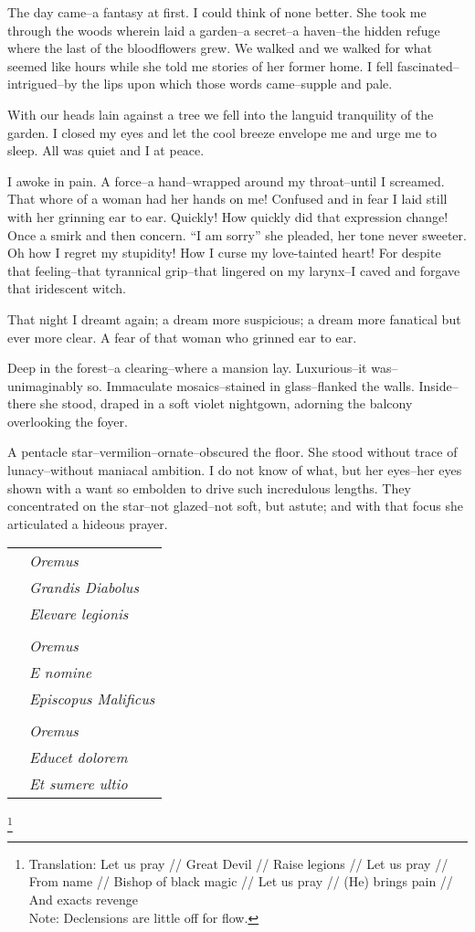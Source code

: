 \documentclass{article}
\begin{document}
\noindent %
The day came--a fantasy at first.
I could think of none better. %
She took me through the woods wherein laid a garden--a
secret--a haven--the hidden refuge where
the last of the bloodflowers grew.
We walked and we walked for what seemed like hours
while she told me stories of her former home.
I fell fascinated--intrigued--by the lips
upon which those words came--supple and pale.


With our heads lain against a tree we
fell into the languid tranquility of the garden.
I closed my eyes and let the cool breeze envelope me
and urge me to sleep. All was quiet and I at peace.


I awoke in pain.
A force--a hand--wrapped around my throat--until I screamed.
That whore of a woman had her hands on me!
Confused and in fear I laid still
with her grinning ear to ear.
Quickly! How quickly did that expression change!
Once a smirk and then concern.
``I am sorry'' she pleaded, her tone never sweeter.
Oh how I regret my stupidity!
How I curse my love-tainted heart!
For despite that feeling--that
tyrannical grip--that lingered on my larynx--I
caved and forgave that iridescent witch.


That night I dreamt again; a dream more suspicious;
a dream more fanatical but ever more clear.
A fear of that woman who grinned ear to ear. %
\vvvv


\noindent
Deep in the forest--a clearing--where a mansion lay.
Luxurious--it was--unimaginably so.
Immaculate mosaics--stained in glass--flanked the walls.
Inside--there she stood, draped in a soft violet nightgown,
adorning the balcony overlooking the foyer.


A pentacle star--vermilion--ornate--obscured the floor.
She stood without trace of lunacy--without
maniacal ambition.
I do not know of what, but her eyes--her eyes
shown with a want so embolden to drive
such incredulous lengths.
They concentrated on the star--not
glazed--not soft, but astute; and with
that focus she articulated a hideous prayer.
\VV


\singlespace
\begin{tabular}{ll}
& \textit{Oremus} \\
& \textit{Grandis Diabolus} \\
& \textit{Elevare legionis} \\
& \\
& \textit{Oremus} \\
& \textit{E nomine} \\
& \textit{Episcopus Malificus} \\
& \\
& \textit{Oremus} \\
& \textit{Educet dolorem} \\
& \textit{Et sumere ultio} \\
\end{tabular}\revertspace\footnote{
Translation:
Let us pray // Great Devil // Raise legions //
Let us pray // From name // Bishop of black magic //
Let us pray // (He) brings pain // And exacts revenge \\
\indent
Note: Declensions are little off for flow.
} \vspace*{3ex}
\end{document}
